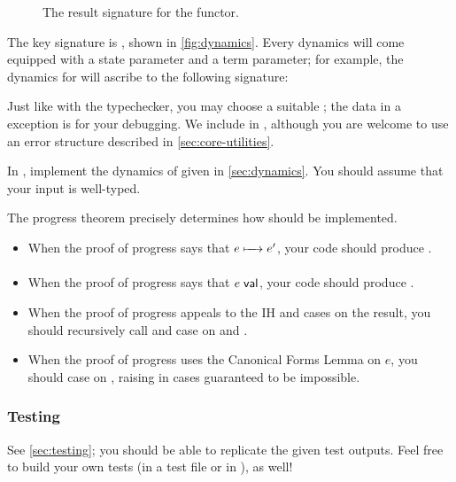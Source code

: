 \documentclass[11pt]{article}
\begin{document}
\begin{figure}
  \caption{The result signature for the  functor.}
  \label{fig:state-transition}
\end{figure}

The key signature is , shown in \cref{fig:dynamics}.
Every dynamics will come equipped with a state parameter and a term parameter; for example, the dynamics for \LangPSF{} will ascribe to the following signature:


Just like with the typechecker, you may choose a suitable ; the data in a  exception is for your debugging.
We include  in , although you are welcome to use an error structure described in \cref{sec:core-utilities}.

\clearpage
\begin{task}{40}
  In , implement the dynamics of \LangPSF{} given in \cref{sec:dynamics}.
  You should assume that your input is well-typed.
\end{task}
\begin{hint}
  The progress theorem precisely determines how  should be implemented.
  \begin{itemize}
    \item When the proof of progress says that $e \xmapsto[\,\,]{\hspace*{1em}} e'$, your code should produce .
    \item When the proof of progress says that ${e}\;{\textsf{val}_{}}$, your code should produce .
    \item When the proof of progress appeals to the IH and cases on the result, you should recursively call  and case on  and .
    \item When the proof of progress uses the Canonical Forms Lemma on $e$, you should case on , raising  in cases guaranteed to be impossible.
  \end{itemize}
\end{hint}

\subsubsection{Testing}
See \cref{sec:testing}; you should be able to replicate the given test outputs.
Feel free to build your own tests (in a test file or in ), as well!
\end{document}
